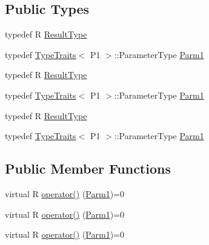 \subsection*{Public Types}
\begin{DoxyCompactItemize}
\item 
typedef R \mbox{\hyperlink{classUtil_1_1FunctorImpl_3_01R_00_01TYPELIST__1_07P1_08_4_a15eeae50d81fe84dfae39ecc200cb08a}{Result\+Type}}
\item 
typedef \mbox{\hyperlink{classUtil_1_1TypeTraits}{Type\+Traits}}$<$ P1 $>$\+::Parameter\+Type \mbox{\hyperlink{classUtil_1_1FunctorImpl_3_01R_00_01TYPELIST__1_07P1_08_4_a907de03623e2a575252ce08c64b52a8d}{Parm1}}
\item 
typedef R \mbox{\hyperlink{classUtil_1_1FunctorImpl_3_01R_00_01TYPELIST__1_07P1_08_4_a15eeae50d81fe84dfae39ecc200cb08a}{Result\+Type}}
\item 
typedef \mbox{\hyperlink{classUtil_1_1TypeTraits}{Type\+Traits}}$<$ P1 $>$\+::Parameter\+Type \mbox{\hyperlink{classUtil_1_1FunctorImpl_3_01R_00_01TYPELIST__1_07P1_08_4_a907de03623e2a575252ce08c64b52a8d}{Parm1}}
\item 
typedef R \mbox{\hyperlink{classUtil_1_1FunctorImpl_3_01R_00_01TYPELIST__1_07P1_08_4_a15eeae50d81fe84dfae39ecc200cb08a}{Result\+Type}}
\item 
typedef \mbox{\hyperlink{classUtil_1_1TypeTraits}{Type\+Traits}}$<$ P1 $>$\+::Parameter\+Type \mbox{\hyperlink{classUtil_1_1FunctorImpl_3_01R_00_01TYPELIST__1_07P1_08_4_a907de03623e2a575252ce08c64b52a8d}{Parm1}}
\end{DoxyCompactItemize}
\subsection*{Public Member Functions}
\begin{DoxyCompactItemize}
\item 
virtual R \mbox{\hyperlink{classUtil_1_1FunctorImpl_3_01R_00_01TYPELIST__1_07P1_08_4_a62c984afa0dca11e0101cfcba2052a8c}{operator()}} (\mbox{\hyperlink{structUtil_1_1Private_1_1FunctorImplBase_a9d61e693d6c616dea5bd9d9073c7d21a}{Parm1}})=0
\item 
virtual R \mbox{\hyperlink{classUtil_1_1FunctorImpl_3_01R_00_01TYPELIST__1_07P1_08_4_a62c984afa0dca11e0101cfcba2052a8c}{operator()}} (\mbox{\hyperlink{structUtil_1_1Private_1_1FunctorImplBase_a9d61e693d6c616dea5bd9d9073c7d21a}{Parm1}})=0
\item 
virtual R \mbox{\hyperlink{classUtil_1_1FunctorImpl_3_01R_00_01TYPELIST__1_07P1_08_4_a62c984afa0dca11e0101cfcba2052a8c}{operator()}} (\mbox{\hyperlink{structUtil_1_1Private_1_1FunctorImplBase_a9d61e693d6c616dea5bd9d9073c7d21a}{Parm1}})=0
\end{DoxyCompactItemize}
